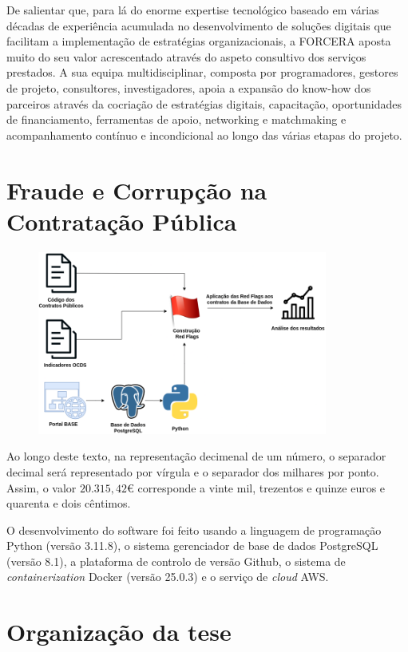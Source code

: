 De salientar que, para lá do enorme expertise tecnológico baseado em várias décadas de experiência acumulada no desenvolvimento de soluções digitais que facilitam a implementação de estratégias organizacionais, a FORCERA aposta muito do seu valor acrescentado através do aspeto consultivo dos serviços prestados. A sua equipa multidisciplinar, composta por programadores, gestores de projeto, consultores, investigadores, apoia a expansão do know-how dos parceiros através da cocriação de estratégias digitais, capacitação, oportunidades de financiamento, ferramentas de apoio, networking e matchmaking e acompanhamento contínuo e incondicional ao longo das várias etapas do projeto.



\section{Fraude e Corrupção na Contratação Pública}


\begin{figure}[H]
	\centering
	\includegraphics[width=0.85\textwidth]{imagens/processo_tese.png}
	\caption{}
	\label{}
\end{figure}

Ao longo deste texto, na representação decimenal de um número, o separador decimal será representado por vírgula e o separador dos milhares por ponto. Assim, o valor $20.315,42 €$ corresponde a vinte mil, trezentos e quinze euros e quarenta e dois cêntimos. 

O desenvolvimento do software foi feito usando a linguagem de programação Python (versão 3.11.8), o sistema gerenciador de base de dados PostgreSQL (versão 8.1), a plataforma de controlo de versão Github, o sistema de \textit{containerization} Docker (versão 25.0.3) e o serviço de \textit{cloud} AWS. 




\section{Organização da tese}

%
%
%
%
%
%
%

